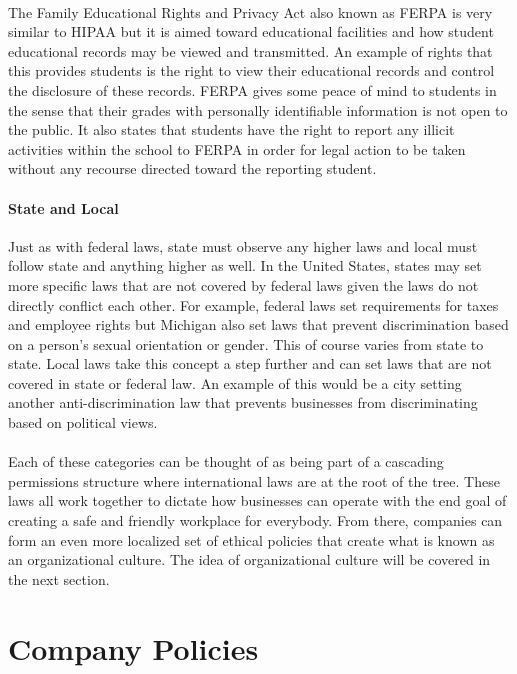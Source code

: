 \documentclass[notitlepage,a4paper,12pt]{article}
\begin{document}
\paragraph{}The Family Educational Rights and Privacy Act also known as FERPA is very similar to HIPAA but it is aimed toward educational facilities and how student educational records may be viewed and transmitted. An example of rights that this provides students is the right to view their educational records and control the disclosure of these records. FERPA gives some peace of mind to students in the sense that their grades with personally identifiable information is not open to the public. It also states that students have the right to report any illicit activities within the school to FERPA in order for legal action to be taken without any recourse directed toward the reporting student.
\paragraph{State and Local}Just as with federal laws, state must observe any higher laws and local must follow state and anything higher as well. In the United States, states may set more specific laws that are not covered by federal laws given the laws do not directly conflict each other. For example, federal laws set requirements for taxes and employee rights but Michigan also set laws that prevent discrimination based on a person's sexual orientation or gender. This of course varies from state to state. Local laws take this concept a step further and can set laws that are not covered in state or federal law. An example of this would be a city setting another anti-discrimination law that prevents businesses from discriminating based on political views.
\paragraph{}Each of these categories can be thought of as being part of a cascading permissions structure where international laws are at the root of the tree. These laws all work together to dictate how businesses can operate with the end goal of creating a safe and friendly workplace for everybody. From there, companies can form an even more localized set of ethical policies that create what is known as an organizational culture. The idea of organizational culture will be covered in the next section.

\section*{Company Policies}
\end{document}
